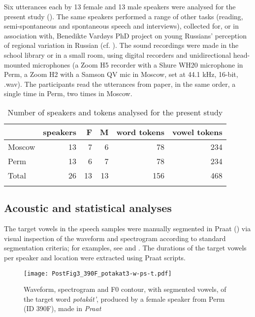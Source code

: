 \documentclass[output=paper]{langscibook}
\begin{document}
Six utterances each by 13 female and 13 male speakers were analysed for the present study (). The same speakers performed a range of other tasks (reading, semi-spontaneous and spontaneous speech and interviews), collected for, or in association with, Benedikte Vardøys PhD project on young Russians’ perception of regional variation in Russian (cf. \citealt{Vardøy2021, RN1173}). The sound recordings were made in the school library or in a small room, using digital recorders and unidirectional head-mounted microphones (a Zoom H5 recorder with a Shure WH20 microphone in Perm, a Zoom H2 with a Samson QV mic in Moscow, set at 44.1 kHz, 16-bit, .wav). The participants read the utterances from paper, in the same order, a single time in Perm, two times in Moscow.


\begin{table}
\begin{tabular}{lrrrrr}
\lsptoprule
 & {speakers} & { F} & { M} & { word tokens} & {vowel tokens}\\
\midrule
 Moscow &  13 &  7 &  6 &  78 &  234\\
Perm &  13 &  6 &  7 &  78 &  234\\
Total &  26 &  13 &  13 &  156 & 468\\
\lspbottomrule
\end{tabular}
\caption{\label{tab:post:1}Number of speakers and tokens analysed for the present study}
\end{table}

\subsection{Acoustic and statistical analyses}
\label{sec:post:2.2}
The target vowels in the speech samples were manually segmented in Praat (\citealt{BoersmaWeenink1992}) via visual inspection of the waveform and spectrogram according to standard segmentation criteria; for examples, see  and . The durations of the target vowels per speaker and location were extracted using Praat scripts.


\begin{figure}
\texttt{[image: PostFig3\_390F\_potakat3-w-ps-t.pdf]}
\caption{\label{fig:post:3} Waveform, spectrogram and F0 contour, with segmented vowels, of the target word \textit{potakát’}, produced by a female speaker from Perm (ID 390F), made in \textit{Praat} \citealt{BoersmaWeenink1992}}
\end{figure}
\end{document}
